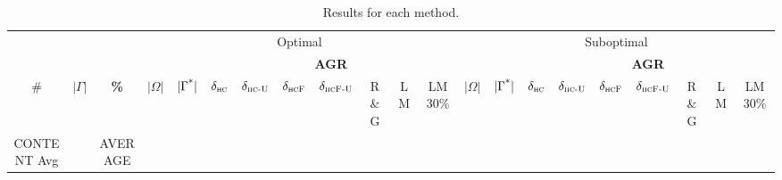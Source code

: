 \documentclass[letterpaper]{article}
\newcommand{\hdeltahc}{\ensuremath{\delta_{\textsc{hc}}}}
\newcommand{\hdeltahcu}{\ensuremath{\delta_{\textsc{hc-U}}}}
\newcommand{\hdeltahcf}{\ensuremath{\delta_{\textsc{hcF}}}}
\newcommand{\hdeltahcfu}{\ensuremath{\delta_{\textsc{hcF-U}}}}
\newcommand{\completion}{LM}
\newcommand{\completiontetha}{LM 30\%}
\newcommand{\rg}{R\&G}
\begin{document}
\begin{table*}[]
\centering
\fontsize{4}{4}\selectfont
\setlength\tabcolsep{1.5pt}
\begin{tabular}{ccccccccccccccccccccc}
\toprule
 & & & \multicolumn{9}{c}{Optimal} & \multicolumn{9}{c}{Suboptimal}\\
\cmidrule(lr){4-12}\cmidrule(lr){13-21}
 & & & & & \multicolumn{7}{c}{\textbf{AGR}} & & & \multicolumn{7}{c}{\textbf{AGR}}\\
\cline{6-12} \cline{15-21}
\# & $|\Gamma|$ & \textbf{\%} & $|\Omega|$ & $|\Gamma^\textup{*}|$ & \hdeltahc & \hdeltahcu & \hdeltahcf & \hdeltahcfu & \rg & \completion & \completiontetha & $|\Omega|$ & $|\Gamma^\textup{*}|$ & \hdeltahc & \hdeltahcu & \hdeltahcf & \hdeltahcfu & \rg & \completion & \completiontetha \\
\midrule
CONTENT
Avg & & AVERAGE\\
\bottomrule
\end{tabular}\\
\caption{Results for each method.}
\end{table*}
\end{document}
